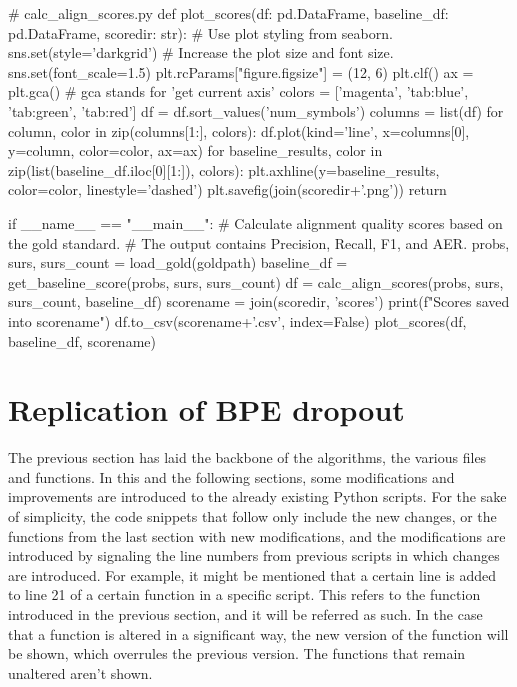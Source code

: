 \begin{python}
# calc_align_scores.py
def plot_scores(df: pd.DataFrame, baseline_df: pd.DataFrame, scoredir: str):
  # Use plot styling from seaborn.
  sns.set(style='darkgrid')
  # Increase the plot size and font size.
  sns.set(font_scale=1.5)
  plt.rcParams["figure.figsize"] = (12, 6)
  plt.clf()
  ax = plt.gca() # gca stands for 'get current axis'
  colors = ['magenta', 'tab:blue', 'tab:green', 'tab:red']
  df = df.sort_values('num_symbols')
  columns = list(df)
  for column, color in zip(columns[1:], colors):
    df.plot(kind='line', x=columns[0], y=column, color=color, ax=ax)
  for baseline_results, color in zip(list(baseline_df.iloc[0][1:]), colors):
    plt.axhline(y=baseline_results, color=color, linestyle='dashed')
  plt.savefig(join(scoredir+'.png'))
  return

if __name__ == "__main__":
  # Calculate alignment quality scores based on the gold standard.
  # The output contains Precision, Recall, F1, and AER.
  probs, surs, surs_count = load_gold(goldpath)
  baseline_df = get_baseline_score(probs, surs, surs_count)
  df = calc_align_scores(probs, surs, surs_count, baseline_df)
  scorename = join(scoredir, 'scores')
  print(f"Scores saved into {scorename}")
  df.to_csv(scorename+'.csv', index=False)
  plot_scores(df, baseline_df, scorename)
\end{python}

\section{Replication of BPE dropout}

The previous section has laid the backbone of the algorithms, the various files and functions. In this and the following sections, some modifications and improvements are introduced to the already existing Python scripts. For the sake of simplicity, the code snippets that follow only include the new changes, or the functions from the last section with new modifications, and the modifications are introduced by signaling the line numbers from previous scripts in which changes are introduced. For example, it might be mentioned that a certain line is added to line 21 of a certain function in a specific script. This refers to the function introduced in the previous section, and it will be referred as such. In the case that a function is altered in a significant way, the new version of the function will be shown, which overrules the previous version. The functions that remain unaltered aren't shown.

